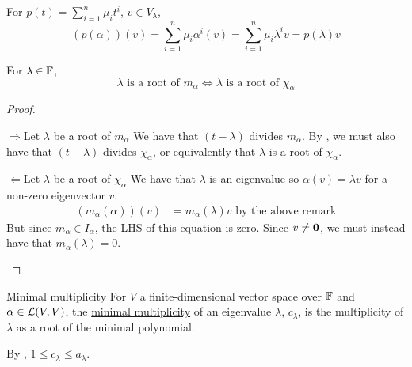 \documentclass[../Main.tex]{subfiles}
\begin{document}
\begin{remark}
    For $p(t) = \sum_{i=1}^{n}\mu_i t^i$, $v \in V_\lambda$,
    \begin{equation*}
        (p(\alpha))(v) = \sum_{i=1}^n \mu_i \alpha^i(v) = \sum_{i=1}^{n} \mu_i \lambda^i v = p(\lambda) v
    \end{equation*}
\end{remark}
\begin{lemma}
    For $\lambda \in \mathbb{F}$,
    \begin{equation*}
        \lambda \text{ is a root of } m_\alpha \iff \lambda \text{ is a root of } \chi_\alpha
    \end{equation*}
    \label{lemMinPolyCharPolySameRoots}
\end{lemma}
\begin{proof}
    \begin{proofdirection}{$\Rightarrow$}{Let $\lambda$ be a root of $m_\alpha$}
        We have that $(t - \lambda)$ divides $m_\alpha$. By , we must also have that $(t - \lambda)$ divides $\chi_\alpha$, or equivalently that $\lambda$ is a root of $\chi_\alpha$.
    \end{proofdirection}
    \begin{proofdirection}{$\Leftarrow$}{Let $\lambda$ be a root of $\chi_{\alpha}$}
        We have that $\lambda$ is an eigenvalue so $\alpha(v) = \lambda v$ for a non-zero eigenvector $v$.
        \begin{align*}
            (m_\alpha(\alpha))(v)&= m_\alpha(\lambda) v \text{ by the above remark}
        \end{align*}
        But since $m_\alpha \in I_\alpha$, the LHS of this equation is zero. Since $v \neq \boldsymbol{0}$, we must instead have that $m_{\alpha}(\lambda) = 0$.
    \end{proofdirection}
\end{proof}
\begin{definition}{Minimal multiplicity}
    For $V$ a finite-dimensional vector space over $\mathbb{F}$ and $\alpha \in \mathcal{L}(V, V)$, the \underline{minimal multiplicity} of an eigenvalue $\lambda$, $c_\lambda$, is the multiplicity of $\lambda$ as a root of the minimal polynomial.
\end{definition}
\begin{remark}
    By , $1 \leq c_\lambda \leq a_\lambda$.
\end{remark}
\end{document}
